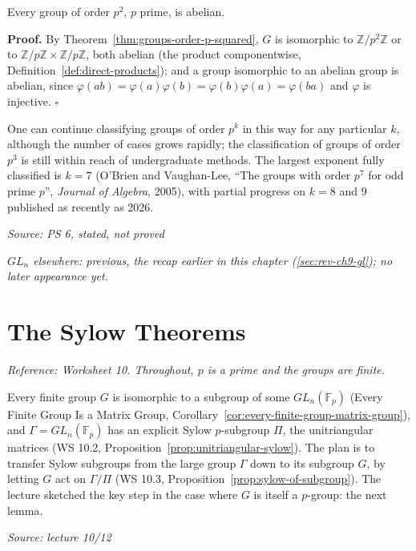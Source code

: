 \documentclass[11pt]{report}
\renewenvironment{proof}[1][Proof]{\noindent\textbf{#1.} }{\hfill$\square$\par\vspace{5pt}}
\newcommand{\srcline}[1]{\par\hfill{\footnotesize\textit{Source: #1}}}
\begin{document}
\begin{corbox}\label{cor:order-p-squared-abelian}
Every group of order $p^2$, $p$ prime, is abelian.
\end{corbox}

\begin{proof}
By Theorem~\ref{thm:groups-order-p-squared}, $G$ is isomorphic to $\mathbb{Z}/p^2\mathbb{Z}$ or to $\mathbb{Z}/p\mathbb{Z} \times \mathbb{Z}/p\mathbb{Z}$, both abelian (the product componentwise, Definition~\ref{def:direct-products}); and a group isomorphic to an abelian group is abelian, since $\varphi(ab) = \varphi(a)\varphi(b) = \varphi(b)\varphi(a) = \varphi(ba)$ and $\varphi$ is injective.
\end{proof}

\begin{rembox}\label{rem:groups-order-pk}
One can continue classifying groups of order $p^k$ in this way for any particular $k$, although the number of cases grows rapidly; the classification of groups of order $p^3$ is still within reach of undergraduate methods. The largest exponent fully classified is $k = 7$ (O'Brien and Vaughan-Lee, ``The groups with order $p^7$ for odd prime $p$'', \emph{Journal of Algebra}, 2005), with partial progress on $k = 8$ and $9$ published as recently as 2026.
\srcline{PS 6, stated, not proved}
\end{rembox}

\textit{$GL_n$ elsewhere: previous, the recap earlier in this chapter (\ref{sec:rev-ch9-gl}); no later appearance yet.}

\section{The Sylow Theorems}\label{sec:sylow-theorems}

\textit{Reference: Worksheet 10. Throughout, $p$ is a prime and the groups are finite.}

\begin{rembox}\label{rem:sylow-strategy}
Every finite group $G$ is isomorphic to a subgroup of some $GL_n(\mathbb{F}_p)$ (Every Finite Group Is a Matrix Group, Corollary~\ref{cor:every-finite-group-matrix-group}), and $\Gamma = GL_n(\mathbb{F}_p)$ has an explicit Sylow $p$-subgroup $\Pi$, the unitriangular matrices (WS 10.2, Proposition~\ref{prop:unitriangular-sylow}). The plan is to transfer Sylow subgroups from the large group $\Gamma$ down to its subgroup $G$, by letting $G$ act on $\Gamma/\Pi$ (WS 10.3, Proposition~\ref{prop:sylow-of-subgroup}). The lecture sketched the key step in the case where $G$ is itself a $p$-group: the next lemma.
\srcline{lecture 10/12}
\end{rembox}
\end{document}
